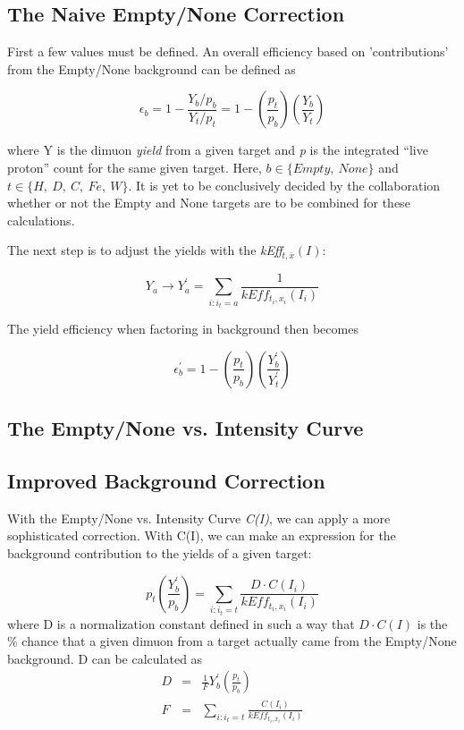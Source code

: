 \subsection{The Naive Empty/None Correction}

First a few values must be defined. An overall efficiency based on 'contributions' from the Empty/None background can be defined as

\begin{equation}
\epsilon_b = 1 - \frac{Y_b/p_b}{Y_t/p_t} = 1 - \left(\frac{p_t}{p_b}\right) \left( \frac{Y_b}{Y_t} \right)
\end{equation}

where Y is the dimuon \emph{yield} from a given target and \emph{p} is the integrated ``live proton'' count for the same given target. Here, $b \in \{Empty,\ None\}$ and $t\in\{H,\ D,\ C,\ Fe,\ W\}$. It is yet to be conclusively decided by the collaboration whether or not the Empty and None targets are to be combined for these calculations.

The next step is to adjust the yields with the \emph{kEff}$_{t,\bar{x}}(I)$:

\begin{equation}
Y_a \rightarrow Y_a^\prime = \sum_{i:i_t=a} \frac{1}{kEff_{t_i, x_i}(I_i)}
\end{equation}

The yield efficiency when factoring in background then becomes

\begin{equation}
\epsilon^\prime_b = 1 - \left(\frac{p_t}{p_b}\right) \left( \frac{Y^\prime_b}{Y^\prime_t} \right)
\end{equation}

\subsection{The Empty/None vs. Intensity Curve}


\subsection{Improved Background Correction}

With the Empty/None vs. Intensity Curve \emph{C(I)}, we can apply a more sophisticated correction. With C(I), we can make an expression for the background contribution to the yields of a given target:

\begin{equation}
p_t \left( \frac{Y^\prime_b}{p_b} \right) = \sum_{i:i_t=t} \frac{D\cdot C(I_i)}{kEff_{t_i, x_i}(I_i)}
\end{equation}
where D is a normalization constant defined in such a way that $D \cdot C(I)$ is the \% chance that a given dimuon from a target actually came from the Empty/None background. D can be calculated as
\begin{eqnarray}
D & = & \frac{1}{F} Y^\prime_b \left( \frac{p_t}{p_b} \right) \\
F & = &\sum_{i: i_t=t} \frac{C(I_i)}{kEff_{t_i, x_i}(I_i)}
\end{eqnarray}

